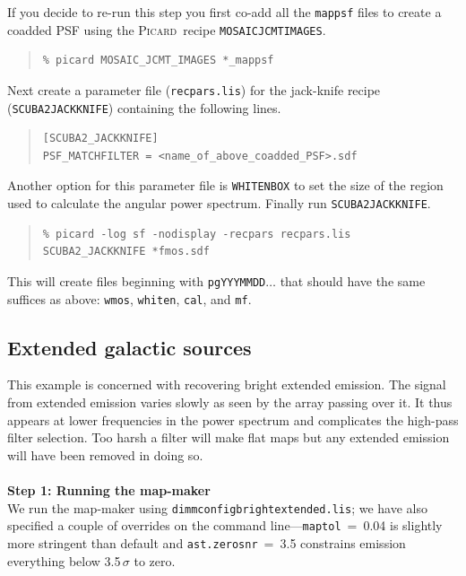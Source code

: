 \documentclass[twoside,11pt]{article}
\newcommand{\xref}[3]{#1}
\newcommand{\xlabel}[1]{}
\renewcommand{\_}{\texttt{\symbol{95}}}
\newenvironment{myquote}{
   \color{MidnightBlue}\begin{quote}\begin{small}}{
   \end{small}\end{quote}
}
\newcommand{\picard}{\xref{\textsc{Picard}}{sun265}{}}
\newcommand{\drrecipe}[1]{\texttt{#1}}
\newcommand{\param}[1]{\texttt{#1}}
\newcommand{\file}[1]{\texttt{#1}}
\renewenvironment{myquote}{
      \begin{quote}\begin{small}}{
      \end{small}\end{quote}
   }
\begin{document}
If you decide to re-run this step you first co-add all the
\file{\_mappsf} files to create a coadded PSF using the \picard\ recipe
\xref{\drrecipe{MOSAIC\_JCMT\_IMAGES}}{sun265}{MOSAIC_JCMT_IMAGES}.
\begin{myquote}
\begin{verbatim}
% picard MOSAIC_JCMT_IMAGES *_mappsf
\end{verbatim}
\end{myquote}
Next create a parameter file (\file{recpars.lis}) for the jack-knife
recipe (\drrecipe{SCUBA2\_JACKKNIFE}) containing the following lines.
\begin{myquote}
\begin{verbatim}
[SCUBA2_JACKKNIFE]
PSF_MATCHFILTER = <name_of_above_coadded_PSF>.sdf
\end{verbatim}
\end{myquote}
Another option for this parameter file is \param{WHITEN\_BOX} to set the
size of the region used to calculate the angular power spectrum.
Finally run \drrecipe{SCUBA2\_JACKKNIFE}.
\begin{myquote}
\begin{verbatim}
% picard -log sf -nodisplay -recpars recpars.lis SCUBA2_JACKKNIFE *fmos.sdf
\end{verbatim}
\end{myquote}
This will create files beginning with \file{pgYYYMMDD}$\ldots$ that
should have the same suffices as above: \file{\_wmos},
\file{\_whiten}, \file{\_cal}, and \file{\_mf}.



\subsection{\xlabel{Galactic}Extended galactic sources}
\label{sec:bright_ex}

This example is concerned with recovering bright extended emission.
The signal from extended emission varies slowly as seen by the array
passing over it. It thus appears at lower frequencies in the power
spectrum and complicates the high-pass filter selection. Too harsh a
filter will make flat maps but any extended emission will have been
removed in doing so.
\\ \\
\textbf{Step 1: Running the map-maker}
\vspace{0.2cm}\\
We run the map-maker using \file{dimmconfig\_bright\_extended.lis};
we have also specified a couple of overrides on the command
line---\param{maptol}~=~0.04 is slightly more stringent than default and
\param{ast.zero\_snr}~=~3.5 constrains emission everything below
3.5\,$\sigma$ to zero.
\end{document}
